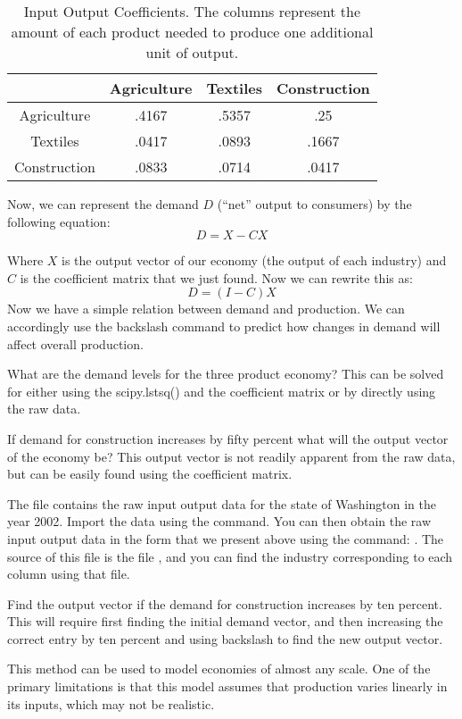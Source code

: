\begin{table}

\begin{center}
\begin{tabular}{|c|c|c|c|} 
\hline
& Agriculture & Textiles & Construction \\ \hline
Agriculture & .4167 & .5357 & .25 \\ \hline
Textiles & .0417 & .0893 & .1667 \\ \hline
Construction & .0833 & .0714 & .0417 \\ \hline
\end{tabular}
\caption{Input Output Coefficients. The columns represent the amount of each product needed to produce one additional unit of output.} \label{IOCoefTable}
\end{center}
\end{table}

Now, we can represent the demand $D$ (``net'' output to consumers) by the following equation:
\[
D = X-CX
\]

Where $X$ is the output vector of our economy (the output of each industry) and $C$ is the coefficient matrix that we just found. Now we can rewrite this as:
\[
D = (I-C)X
\]
Now we have a simple relation between demand and production. We can accordingly use the backslash command to predict how changes in demand will affect overall production.

\begin{problem}
What are the demand levels for the three product economy? This can be solved for either using the scipy.lstsq() and the coefficient matrix or by directly using the raw data.
\end{problem}

\begin{problem}
If demand for construction increases by fifty percent what will the output vector of the economy be? This output vector is not readily apparent from the raw data, but can be easily found using the coefficient matrix.
\end{problem}

\begin{problem}
The file  contains the raw input output data for the state of Washington in the year 2002. Import the data using the  command. You can then obtain the raw input output data in the form that we present above using the command: . The source of this file is the file , and you can find the industry corresponding to each column using that file.

Find the output vector if the demand for construction increases by ten percent. This will require first finding the initial demand vector, and then increasing the correct entry by ten percent and using backslash to find the new output vector.
\end{problem}

This method can be used to model economies of almost any scale. One of the primary limitations is that this model assumes that production varies linearly in its inputs, which may not be realistic.


